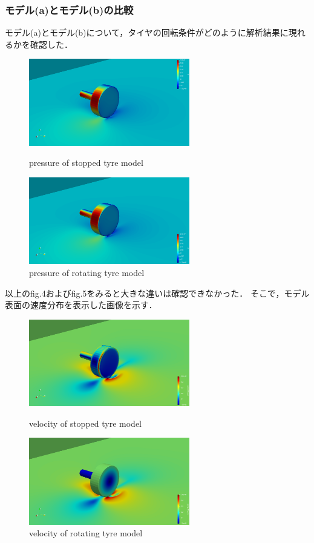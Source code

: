 \documentclass[twocolumn,a4j]{jsarticle}
\begin{document}
\subsubsection{モデル(a)とモデル(b)の比較}
モデル(a)とモデル(b)について，タイヤの回転条件がどのように解析結果に現れるかを確認した．
\begin{figure}[htbp]
    \begin{center}
        \includegraphics[width=70mm]{screenshots/tyremodel_pressure1.png}
        \caption{pressure of stopped tyre model}
        \includegraphics[width=70mm]{screenshots/tyremodel_pressure1_r.png}
        \caption{pressure of rotating tyre model}
    \end{center}
\end{figure}
\par
以上のfig.4およびfig.5をみると大きな違いは確認できなかった．
そこで，モデル表面の速度分布を表示した画像を示す．
\begin{figure}[htbp]
    \begin{center}
        \includegraphics[width=70mm]{screenshots/tyremodel_velocity1.png}
        \caption{velocity of stopped tyre model}
        \includegraphics[width=70mm]{screenshots/tyremodel_velocity1_r.png}
        \caption{velocity of rotating tyre model}
    \end{center}
\end{figure}
\end{document}
